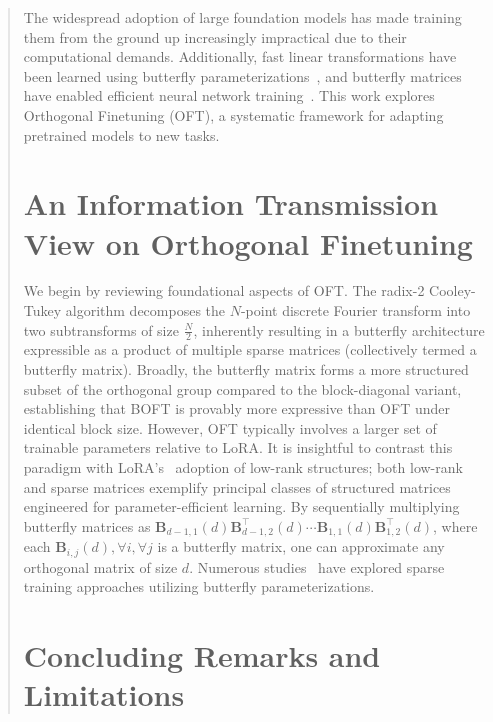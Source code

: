 \begin{abstract}
The widespread adoption of large foundation models has made training them from the ground up increasingly impractical due to their computational demands. Additionally, fast linear transformations have been learned using butterfly parameterizations~\cite{dao2019learning,dao2019kaleidoscope}, and butterfly matrices have enabled efficient neural network training~\cite{chen2022pixelated,dao2022monarch}. This work explores Orthogonal Finetuning (OFT), a systematic framework for adapting pretrained models to new tasks. \section{An Information Transmission View on Orthogonal Finetuning}

We begin by reviewing foundational aspects of OFT. The radix-2 Cooley-Tukey algorithm decomposes the $N$-point discrete Fourier transform into two subtransforms of size $\frac{N}{2}$, inherently resulting in a butterfly architecture expressible as a product of multiple sparse matrices (collectively termed a butterfly matrix). Broadly, the butterfly matrix forms a more structured subset of the orthogonal group compared to the block-diagonal variant, establishing that BOFT is provably more expressive than OFT under identical block size. However, OFT typically involves a larger set of trainable parameters relative to LoRA. It is insightful to contrast this paradigm with LoRA’s~\cite{hulora2022} adoption of low-rank structures; both low-rank and sparse matrices exemplify principal classes of structured matrices~\cite{candes2011robust} engineered for parameter-efficient learning. By sequentially multiplying butterfly matrices as $\bm{B}_{d-1,1}(d)\bm{B}^\top_{d-1,2}(d)\cdots\bm{B}_{1,1}(d)\bm{B}^\top_{1,2}(d)$, where each $\bm{B}_{i,j}(d), \forall i, \forall j$ is a butterfly matrix, one can approximate any orthogonal matrix of size $d$. Numerous studies~\cite{dao2019learning,dao2019kaleidoscope,chen2022pixelated,dao2022monarch} have explored sparse training approaches utilizing butterfly parameterizations. 

\section{Concluding Remarks and Limitations}


\end{abstract}
